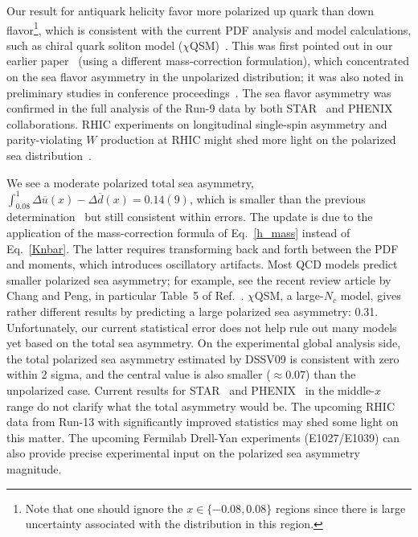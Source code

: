 Our result for antiquark helicity favor more polarized up quark than down
flavor\footnote{Note that one should ignore the $x\in\{-0.08,0.08\}$ regions
since there is large uncertainty associated with the distribution in this region.},
which is consistent with the current PDF analysis and model
calculations, such as chiral quark soliton model
($\chi$QSM)~\cite{Schweitzer:2001sr}. This was first pointed out in
our earlier paper~\cite{Lin:2014zya} (using a different mass-correction formulation), which concentrated on
the sea flavor asymmetry in the unpolarized distribution; it was also noted in
preliminary studies in conference proceedings~\cite{Lin:2014gaa,Lin:2014yra,Lin:2015vxw}. The sea flavor asymmetry was
confirmed in the full analysis of the Run-9 data by both
STAR~\cite{Adamczyk:2014xyw} and PHENIX~\cite{Adare:2015gsd} collaborations.
RHIC experiments on longitudinal single-spin asymmetry and
parity-violating $W$ production at RHIC might shed more light on the
polarized sea distribution~\cite{Aschenauer:2013woa}.

We see a moderate polarized total sea asymmetry,
$\int_{0.08}^1 \Delta \overline{u}(x)-\Delta \overline{d}(x)=0.14(9)$, which is smaller than the previous determination~\cite{Lin:2014zya} but still consistent within errors. The update is due to the application of the mass-correction formula of Eq.~\ref{h_mass} instead of Eq.~\ref{Knbar}. The latter requires transforming back and forth between the PDF and moments, which introduces oscillatory artifacts.
Most QCD models predict smaller polarized sea asymmetry;
for example, see the recent review article by Chang and Peng,
in particular Table~5 of Ref.~\cite{Chang:2014jba}. 
$\chi$QSM, a large-$N_c$ model,
gives rather different results by predicting a large polarized sea asymmetry: 0.31.
Unfortunately, our current statistical error does not   
help rule out many models yet based on the total sea asymmetry.
On the experimental global analysis side, the total polarized sea asymmetry estimated by DSSV09 is
consistent with zero within 2 sigma, and the central value is also smaller ($\approx 0.07$)
than the unpolarized case. Current results for STAR~\cite{Adamczyk:2014xyw}
and PHENIX~\cite{Adare:2015gsd} in the middle-$x$ range do not clarify what the total
asymmetry would be.
The upcoming RHIC data from Run-13 with significantly improved statistics may
shed some light on this matter.
The upcoming Fermilab Drell-Yan experiments (E1027/E1039) can also provide precise
experimental input on the polarized sea asymmetry magnitude.

